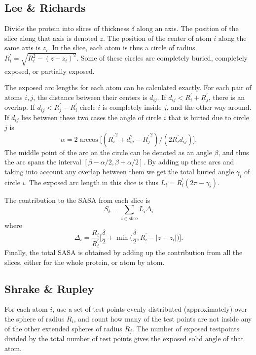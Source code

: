 \documentclass[a4paper,11pt]{article}
\begin{document}
\subsection{Lee \& Richards}

Divide the protein into slices of thickness $\delta$ along an
axis. The position of the slice along that axis is denoted $z$. The
position of the center of atom $i$ along the same axis is $z_i$. In
the slice, each atom is thus a circle of radius $R_i^\prime =
\sqrt{R_i^2-(z-z_i)^2}$. Some of these circles are completely buried,
completely exposed, or partially exposed.

The exposed arc lengths for each atom can be calculated exactly. For
each pair of atoms $i,j$, the distance between their centers is
$d_{ij}$. If $d_{ij} < R_i^\prime + R_j^\prime$, there is an
overlap. If $d_{ij} < R_j^\prime - R_i^\prime$ circle $i$ is
completely inside $j$, and the other way around. If $d_{ij}$ lies
between these two cases the angle of circle $i$ that is buried due to
circle $j$ is $$\alpha = 2\arccos \bigl[({R_i^\prime}^2 + d_{ij}^2 -
  {R_{j}^\prime}^2)/(2R_i^\prime d_{ij})\bigr].$$ The middle point of
the arc on the circle can be denoted as an angle $\beta$, and thus the
arc spans the interval $[\beta-\alpha/2,\beta+\alpha/2]$. By adding up
these arcs and taking into account any overlap between them we get
the total buried angle $\gamma_i$ of circle $i$. The exposed arc length in
this slice is thus $L_i = R_i^\prime(2\pi-\gamma_i)$.

The contribution to the SASA from each slice is $$ S_\delta =
\sum_{i \in \text{slice}}L_i\Delta_i $$ where
$$
  \Delta_i = \frac{R_i}{R_i^\prime} \Biggl[\frac{\delta}{2} 
    + \min\Biggl(\frac{\delta}{2},R_i^\prime -
    \lvert z - z_i \rvert\Biggr)\Biggr]. 
$$ 
Finally, the total SASA is obtained by adding up the contribution from
all the slices, either for the whole protein, or atom by atom.

\subsection{Shrake \& Rupley}

For each atom $i$, use a set of test points evenly distributed
(approximately) over the sphere of radius $R_i$, and count how many of
the test points are not inside any of the other extended spheres of
radius $R_j$. The number of exposed testpoints divided by the total
number of test points gives the exposed solid angle of that atom.
\end{document}
